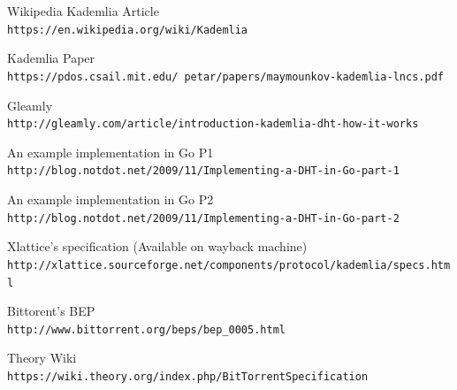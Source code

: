 \documentclass{article}
\begin{document}
\begin{thebibliography}{8}
  
Wikipedia Kademlia Article  
\\\texttt{https://en.wikipedia.org/wiki/Kademlia}

Kademlia Paper
\\\texttt{https://pdos.csail.mit.edu/~petar/papers/maymounkov-kademlia-lncs.pdf}

Gleamly
\\\texttt{http://gleamly.com/article/introduction-kademlia-dht-how-it-works}

An example implementation in Go P1  
\\\texttt{http://blog.notdot.net/2009/11/Implementing-a-DHT-in-Go-part-1}

An example implementation in Go P2
\\\texttt{http://blog.notdot.net/2009/11/Implementing-a-DHT-in-Go-part-2}

Xlattice's specification (Available on wayback machine)
\\\texttt{http://xlattice.sourceforge.net/components/protocol/kademlia/specs.html}

Bittorent's BEP
\\\texttt{http://www.bittorrent.org/beps/bep\_0005.html}

Theory Wiki
\\\texttt{https://wiki.theory.org/index.php/BitTorrentSpecification}

\end{thebibliography}
\end{document}
